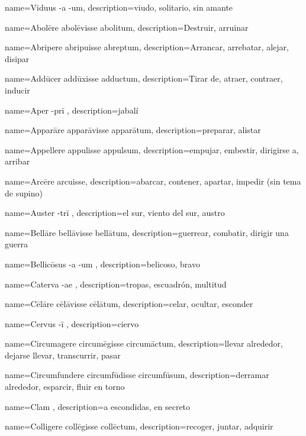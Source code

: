 {name={Viduus -a -um},
description={viudo, solitario, sin amante}}

{name={Abolēre abolēvisse abolitum},
description={Destruir, arruinar}}

{name={Abripere abripuisse abreptum},
description={Arrancar, arrebatar, alejar, disipar}}

{name={Addūcer addūxisse adductum},
description={Tirar de, atraer, contraer, inducir}}


{name={Aper -prī },
description={jabalí}}

{name={Apparāre apparāvisse apparātum},
description={preparar, alistar}}

{name={Appellere appulisse appulsum},
description={empujar, embestir, dirigirse a, arribar}}

{name={Arcēre arcuisse},
description={abarcar, contener, apartar, impedir (sin tema de supino)}}

{name={Auster -trī },
description={el sur, viento del sur, austro}}

{name={Bellāre bellāvisse bellātum},
description={guerrear, combatir, dirigir una guerra}}

{name={Bellicōsus -a -um },
description={belicoso, bravo}}

{name={Caterva -ae },
description={tropas, escuadrón, multitud}}

{name={Cēlāre cēlāvisse cēlātum},
description={celar, ocultar, esconder}}

{name={Cervus -ī },
description={ciervo}}

{name={Circumagere circumēgisse circumāctum},
description={llevar alrededor, dejarse llevar, transcurrir, pasar}}

{name={Circumfundere circumfūdisse circumfūsum},
description={derramar alrededor, esparcir, fluir en torno}}

{name={Clam },
description={a escondidas, en secreto}}

{name={Colligere collēgisse collēctum},
description={recoger, juntar, adquirir}}

